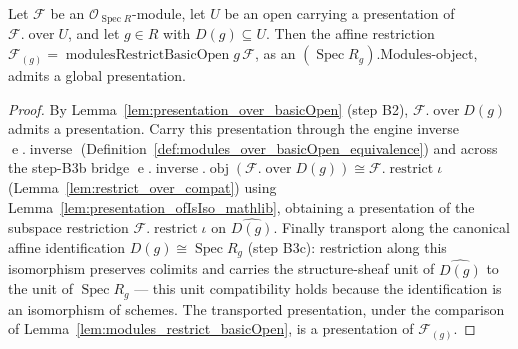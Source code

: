 \begin{lemma}
  \label{lem:presentation_modulesRestrictBasicOpen}
  Let \(\mathcal{F}\) be an \(\mathcal{O}_{\operatorname{Spec} R}\)-module, let \(U\) be an open
  carrying a presentation of \(\mathcal{F}.\operatorname{over} U\), and let \(g \in R\) with
  \(D(g) \subseteq U\). Then the affine restriction \(\mathcal{F}_{(g)} =
  \operatorname{modulesRestrictBasicOpen} g\, \mathcal{F}\), as an
  \((\operatorname{Spec} R_g).\mathrm{Modules}\)-object, admits a global presentation.
\end{lemma}
\begin{proof}
  By Lemma~\ref{lem:presentation_over_basicOpen} (step B2), \(\mathcal{F}.\operatorname{over} D(g)\)
  admits a presentation. Carry this presentation through the engine inverse
  \(\operatorname{e}.\operatorname{inverse}\) (Definition~\ref{def:modules_over_basicOpen_equivalence})
  and across the step-B3b bridge \(\operatorname{e}.\operatorname{inverse}.\operatorname{obj}
  (\mathcal{F}.\operatorname{over} D(g)) \cong \mathcal{F}.\operatorname{restrict} \iota\)
  (Lemma~\ref{lem:restrict_over_compat}) using Lemma~\ref{lem:presentation_ofIsIso_mathlib},
  obtaining a presentation of the subspace restriction \(\mathcal{F}.\operatorname{restrict} \iota\) on
  \(\widehat{D(g)}\). Finally transport along the canonical affine identification \(D(g) \cong
  \operatorname{Spec} R_g\) (step B3c): restriction along this isomorphism preserves colimits and
  carries the structure-sheaf unit of \(\widehat{D(g)}\) to the unit of \(\operatorname{Spec} R_g\)
  — this unit compatibility holds because the identification is an isomorphism of schemes.
  The transported presentation, under
  the comparison of Lemma~\ref{lem:modules_restrict_basicOpen}, is a presentation of
  \(\mathcal{F}_{(g)}\).
\end{proof}



